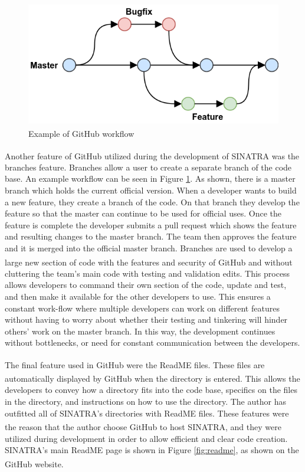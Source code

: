 \begin{figure}
\includegraphics[width=.99\textwidth]{figures/github-flow.png}
\centering
\caption[Example of GitHub\textsuperscript{\textregistered} workflow]{Example of GitHub\textsuperscript{\textregistered} workflow \cite{github}}
\label{fig:github}
\end{figure}




\indent Another feature of GitHub\textsuperscript{\textregistered} utilized during the development of SINATRA was the branches feature. Branches allow a user to create a separate branch of the code base. An example workflow can be seen in Figure \ref{fig:github}. As shown, there is a master branch which holds the current official version. When a developer wants to build a new feature, they create a branch of the code. On that branch they develop the feature so that the master can continue to be used for official uses. Once the feature is complete the developer submits a pull request which shows the feature and resulting changes to the master branch. The team then approves the feature and it is merged into the official master branch. Branches are used to develop a large new section of code with the features and security of GitHub\textsuperscript{\textregistered} and without cluttering the team's main code with testing and validation edits. This process allows developers to command their own section of the code, update and test, and then make it available for the other developers to use. This ensures a constant work-flow where multiple developers can work on different features without having to worry about whether their testing and tinkering will hinder others' work on the master branch. In this way, the development continues without bottlenecks, or need for constant communication between the developers. \par


\indent The final feature used in GitHub\textsuperscript{\textregistered} were the ReadME files. These files are automatically displayed by GitHub\textsuperscript{\textregistered} when the directory is entered. This allows the developers to convey how a directory fits into the code base, specifics on the files in the directory, and instructions on how to use the directory. The author has outfitted all of SINATRA's directories with ReadME files. These features were the reason that the author choose GitHub\textsuperscript{\textregistered} to host SINATRA, and they were utilized during development in order to allow efficient and clear code creation. SINATRA's main ReadME page is shown in Figure \ref{fig:readme}, as shown on the GitHub\textsuperscript{\textregistered} website. 

